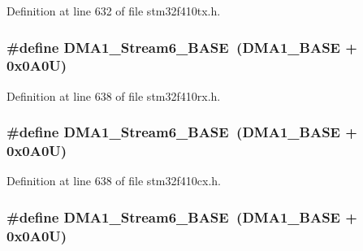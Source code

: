 Definition at line 632 of file stm32f410tx.\+h.

\subsubsection[{\texorpdfstring{D\+M\+A1\+\_\+\+Stream6\+\_\+\+B\+A\+SE}{DMA1_Stream6_BASE}}]{\setlength{\rightskip}{0pt plus 5cm}\#define D\+M\+A1\+\_\+\+Stream6\+\_\+\+B\+A\+SE~({\bf D\+M\+A1\+\_\+\+B\+A\+SE} + 0x0\+A0\+U)}\hypertarget{group___peripheral__registers__structures_ga58998ddc40adb6361704d6c9dad08125}{}\label{group___peripheral__registers__structures_ga58998ddc40adb6361704d6c9dad08125}


Definition at line 638 of file stm32f410rx.\+h.

\subsubsection[{\texorpdfstring{D\+M\+A1\+\_\+\+Stream6\+\_\+\+B\+A\+SE}{DMA1_Stream6_BASE}}]{\setlength{\rightskip}{0pt plus 5cm}\#define D\+M\+A1\+\_\+\+Stream6\+\_\+\+B\+A\+SE~({\bf D\+M\+A1\+\_\+\+B\+A\+SE} + 0x0\+A0\+U)}\hypertarget{group___peripheral__registers__structures_ga58998ddc40adb6361704d6c9dad08125}{}\label{group___peripheral__registers__structures_ga58998ddc40adb6361704d6c9dad08125}


Definition at line 638 of file stm32f410cx.\+h.

\subsubsection[{\texorpdfstring{D\+M\+A1\+\_\+\+Stream6\+\_\+\+B\+A\+SE}{DMA1_Stream6_BASE}}]{\setlength{\rightskip}{0pt plus 5cm}\#define D\+M\+A1\+\_\+\+Stream6\+\_\+\+B\+A\+SE~({\bf D\+M\+A1\+\_\+\+B\+A\+SE} + 0x0\+A0\+U)}\hypertarget{group___peripheral__registers__structures_ga58998ddc40adb6361704d6c9dad08125}{}\label{group___peripheral__registers__structures_ga58998ddc40adb6361704d6c9dad08125}


